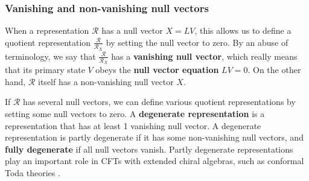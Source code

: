 \documentclass[12pt, a4paper]{article}
\newcommand{\myindex}[1]{\textbf{\boldmath #1}}
\theoremstyle{break}
\begin{document}
\subsubsection{Vanishing and non-vanishing null vectors}

When a representation $\mathcal{R}$ has a null vector $X{}=LV{}$, this allows us to define a quotient representation $\frac{\mathcal{R}}{\mathcal{R}_{X{}}}$ by setting the null vector to zero. 
By an abuse of terminology, we say that $\frac{\mathcal{R}}{\mathcal{R}_{X{}}}$ has a \myindex{vanishing null vector}, which really means that its primary state $V{}$ obeys the \myindex{null vector equation} $LV{}=0$. On the other hand, $\mathcal{R}$ itself has a non-vanishing null vector $X{}$. 

If $\mathcal{R}$ has several null vectors, we can define various quotient representations by setting some null vectors to zero. A \myindex{degenerate representation} is a representation that has at least 1 vanishing null vector. A degenerate representation is partly degenerate if it has some non-vanishing null vectors, and \myindex{fully degenerate} if all null vectors vanish. Partly degenerate representations play an important role in CFTs with extended chiral algebras, such as conformal Toda theories \cite{fl07c}. 
\end{document}
